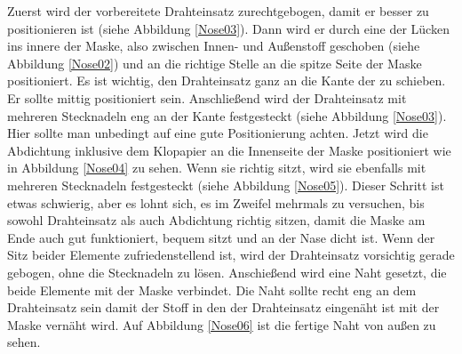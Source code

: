 \documentclass[12pt,parskip=full]{scrartcl}
\begin{document}
Zuerst wird der vorbereitete Drahteinsatz zurechtgebogen, damit er besser zu positionieren ist (siehe Abbildung \ref{Nose03}). Dann wird er durch eine der Lücken ins innere der Maske, also zwischen Innen- und Außenstoff geschoben (siehe Abbildung \ref{Nose02}) und an die richtige Stelle an die spitze Seite der Maske positioniert. Es ist wichtig, den Drahteinsatz ganz an die Kante der zu schieben. Er sollte mittig positioniert sein. Anschließend wird der Drahteinsatz mit mehreren Stecknadeln eng an der Kante festgesteckt (siehe Abbildung \ref{Nose03}). Hier sollte man unbedingt auf eine gute Positionierung achten. Jetzt wird die Abdichtung inklusive dem Klopapier an die Innenseite der Maske positioniert wie in Abbildung \ref{Nose04} zu sehen. Wenn sie richtig sitzt, wird sie ebenfalls mit mehreren Stecknadeln festgesteckt (siehe Abbildung \ref{Nose05}). Dieser Schritt ist etwas schwierig, aber es lohnt sich, es im Zweifel mehrmals zu versuchen, bis sowohl Drahteinsatz als auch Abdichtung richtig sitzen, damit die Maske am Ende auch gut funktioniert, bequem sitzt und an der Nase dicht ist. Wenn der Sitz beider Elemente zufriedenstellend ist, wird der Drahteinsatz vorsichtig gerade gebogen, ohne die Stecknadeln zu lösen. Anschießend wird eine Naht gesetzt, die beide Elemente mit der Maske verbindet. Die Naht sollte recht eng an dem Drahteinsatz sein damit der Stoff in den der Drahteinsatz eingenäht ist mit der Maske vernäht wird. Auf Abbildung \ref{Nose06} ist die fertige Naht von außen zu sehen.
\end{document}
